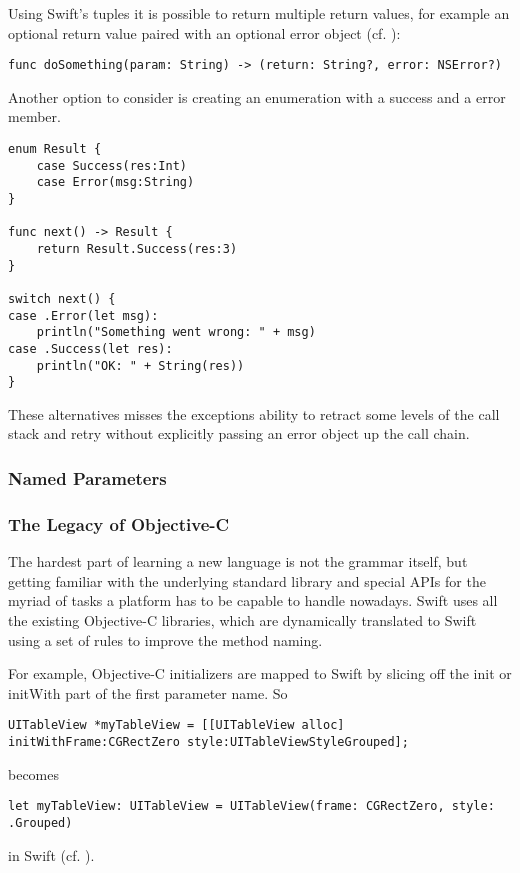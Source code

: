 Using Swift's tuples it is possible to return multiple return values, for example an optional return value paired with an optional error object (cf. \cite{swift-error-handling}):
\begin{lstlisting}[frame=none]
func doSomething(param: String) -> (return: String?, error: NSError?)
\end{lstlisting}

Another option to consider is creating an enumeration with a success and a error member.

\begin{lstlisting}[frame=none]
enum Result {
    case Success(res:Int)
    case Error(msg:String)
}

func next() -> Result {
    return Result.Success(res:3)
}

switch next() {
case .Error(let msg):
    println("Something went wrong: " + msg)
case .Success(let res):
    println("OK: " + String(res))
}\end{lstlisting}

These alternatives misses the exceptions ability to retract some levels of the call stack and retry without explicitly passing an error object up the call chain.

\subsubsection{Named Parameters}

\subsubsection{The Legacy of Objective-C}

The hardest part of learning a new language is not the grammar itself, but getting familiar with the underlying standard library and special APIs for the myriad of tasks a platform has to be capable to handle nowadays.
Swift uses all the existing Objective-C libraries, which are dynamically translated to Swift using a set of rules to improve the method naming.

For example, Objective-C initializers are mapped to Swift by slicing off the init or initWith part of the first parameter name. So

\begin{lstlisting}[frame=none]
UITableView *myTableView = [[UITableView alloc] initWithFrame:CGRectZero style:UITableViewStyleGrouped];
\end{lstlisting}
becomes
\begin{lstlisting}[frame=none]
let myTableView: UITableView = UITableView(frame: CGRectZero, style: .Grouped)
\end{lstlisting}
in Swift (cf. \cite{swift-objc-book}).

